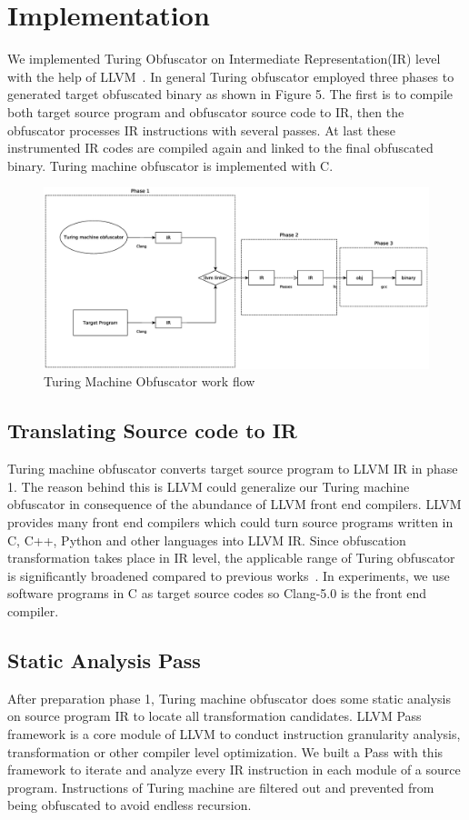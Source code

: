 \documentclass[lnicst]{svmultln}
\begin{document}
\section{Implementation}
We implemented Turing Obfuscator on Intermediate Representation(IR) level with
the help of LLVM~\cite{LLVM}. In general Turing obfuscator employed three phases
to generated target obfuscated binary as shown in Figure 5. The first is to
compile both target source program and obfuscator source code to IR, then the
obfuscator processes IR instructions with several passes. At last these
instrumented IR codes are compiled again and linked to the final obfuscated
binary. Turing machine obfuscator is implemented with C.
\begin{figure}
 \includegraphics[width=\linewidth]{llvm-flow.eps}
 \caption{Turing Machine Obfuscator work flow}
 \label{Figure 5}
\end{figure}
\subsection{Translating Source code to IR}
Turing machine obfuscator converts target source program to LLVM IR in phase 1.
The reason behind this is LLVM could generalize our Turing machine obfuscator in
consequence of the abundance of LLVM front end compilers. LLVM provides many
front end compilers which could turn source programs written in C, C++, Python
and other languages into LLVM IR. Since obfuscation transformation takes place
in IR level, the applicable range of Turing obfuscator is significantly
broadened compared to previous works~\cite{Ma,Zhi}. In experiments, we use
software programs in C as target source codes so Clang-5.0 is the front end
compiler.
\subsection{Static Analysis Pass}
After preparation phase 1, Turing machine obfuscator does some static analysis
on source program IR to locate all transformation candidates. LLVM Pass
framework is a core module of LLVM to conduct instruction granularity analysis,
transformation or other compiler level optimization. We built a Pass with this
framework to iterate and analyze every IR instruction in each module of a source
program. Instructions of Turing machine are filtered out and prevented from
being obfuscated to avoid endless recursion.
\end{document}
